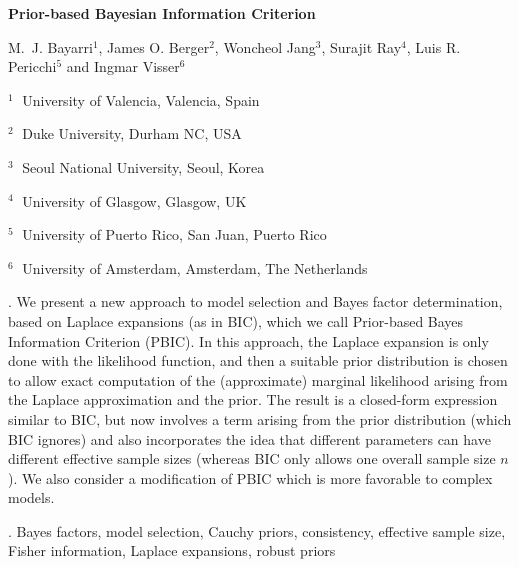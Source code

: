 \documentclass[12pt]{article}
\begin{document}
\begin{flushleft}


{\LARGE\bf Prior-based Bayesian Information Criterion }


\vspace{1.0cm}
M.~J. Bayarri$^1$, James O.  Berger$^2$, Woncheol Jang$^3$, Surajit Ray$^4$, Luis R. Pericchi$^5$ and Ingmar Visser$^6$

\begin{description}

\item $^1 \;$ University of Valencia, Valencia, Spain
\item $^2 \;$ Duke University, Durham NC, USA
\item $^3 \;$ Seoul National University, Seoul, Korea
\item $^4 \;$ University of Glasgow, Glasgow, UK
\item $^5 \;$ University of Puerto Rico, San Juan, Puerto Rico
\item $^6 \;$ University of Amsterdam, Amsterdam, The Netherlands

 
\end{description}

\end{flushleft}


\vspace{0.75cm}

. We present a new approach to model selection and Bayes factor determination, based on Laplace expansions (as in BIC), which we call
Prior-based Bayes Information Criterion (PBIC).
In this approach, the Laplace expansion is only done with the likelihood function, and then
a suitable prior distribution is chosen to allow exact computation of the
(approximate) marginal likelihood arising from the Laplace approximation and the prior.
The result is a closed-form expression similar to BIC, but now involves a term arising from the
prior distribution (which BIC ignores) and also incorporates the idea that different
parameters can have different effective sample sizes (whereas BIC only allows one overall
sample size $n$). We
also consider a modification of PBIC which is more favorable to complex models.

 

\vskip 2mm

.
Bayes factors, model selection, Cauchy priors, consistency,
 effective sample size, Fisher information,
 Laplace expansions, robust priors
 
\end{document}
